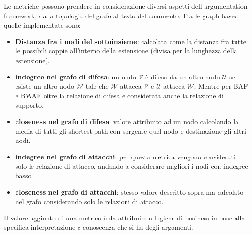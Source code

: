 Le metriche possono prendere in considerazione diversi aspetti dell argumentation framework, dalla topologia del grafo al testo del commento. Fra le graph based quelle implementate sono:

\begin{itemize}
    \item \textbf{Distanza fra i nodi del sottoinsieme}: calcolata come la distanza fra tutte le possibili coppie all'interno della estensione (divisa per la lunghezza della estensione).

    \item \textbf{indegree nel grafo di difesa}: un nodo $\mathcal{V}$ è difeso da un altro nodo $\mathcal{U}$ se esiste un altro nodo $\mathcal{W}$ tale che $\mathcal{W}$ attacca $\mathcal{V}$ e $\mathcal{U}$ attacca $\mathcal{W}$. Mentre per BAF e BWAF oltre la relazione di difesa è considerata anche la relazione di supporto.

    \item \textbf{closeness nel grafo di difesa}: valore attribuito ad un nodo calcolando la media di tutti gli shortest path con sorgente quel nodo e destinazione gli altri nodi.

    \item \textbf{indegree nel grafo di attacchi}: per questa metrica vengono considerati solo le relazione di attacco, andando a considerare migliori i nodi con indegree basso.

    \item \textbf{closeness nel grafo di attacchi}: stesso valore descritto sopra ma calcolato nel grafo considerando solo le relazioni di attacco.
\end{itemize}


Il valore aggiunto di una metrica è da attribuire a logiche di business in base alla specifica interpretazione e conoscenza che si ha degli argomenti.

